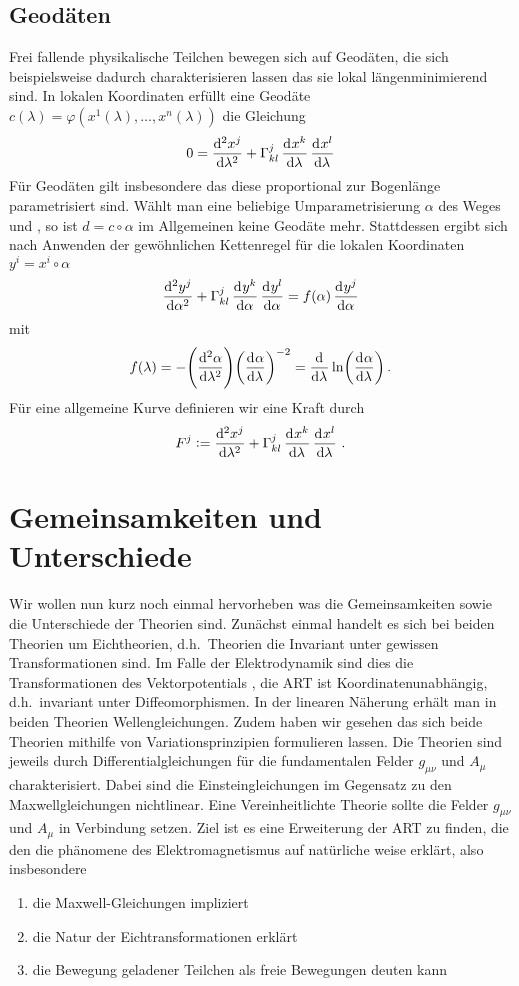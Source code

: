 \subsection{Geodäten}
Frei fallende physikalische Teilchen bewegen sich auf Geodäten, die sich 
beispielsweise dadurch charakterisieren lassen das sie lokal längenminimierend
sind. In lokalen Koordinaten erfüllt eine Geodäte 
$c(\lambda)=\varphi(x^1(\lambda),\dots, x^n(\lambda))$ die Gleichung
\begin{equation}
0=\dod[2]{x^j}{\lambda}+\Gamma^{j}_{kl}\dod{x^k}{\lambda}\dod{x^l}{\lambda}
\end{equation}
Für Geodäten gilt insbesondere das diese proportional zur Bogenlänge
parametrisiert sind. Wählt man eine beliebige Umparametrisierung  $\alpha$ des Weges 
und , so ist $d=c\circ \alpha$ im Allgemeinen keine
Geodäte mehr. Stattdessen ergibt sich nach Anwenden der gewöhnlichen Kettenregel
für die lokalen Koordinaten $y^i=x^i\circ\alpha$
\begin{equation}
\dod[2]{y^j}{\alpha}+\Gamma^{j}_{kl}\dod{y^k}{\alpha}\dod{y^l}{\alpha}
=f(\alpha)\dod{y^j}{\alpha}
\end{equation}
mit 
\begin{equation}
f(\lambda)
 =-\left(\dod[2]{\alpha}{\lambda}\right)\left(\dod{\alpha}{\lambda}\right)^{-2}
 =\dod{}{\lambda}\ln\left(\dod{\alpha}{\lambda}\right)\,.
\end{equation}
Für eine allgemeine Kurve definieren wir eine Kraft durch
\begin{equation}
F^j:=\dod[2]{x^j}{\lambda}+\Gamma^{j}_{kl}\dod{x^k}{\lambda}\dod{x^l}{\lambda}\,.
\end{equation}
\section{Gemeinsamkeiten und Unterschiede}
Wir wollen nun kurz noch einmal hervorheben was die Gemeinsamkeiten
sowie die Unterschiede der Theorien sind.
Zunächst einmal handelt es sich bei beiden Theorien um Eichtheorien, d.h.\
Theorien die Invariant unter gewissen Transformationen sind.
Im Falle der Elektrodynamik sind dies die Transformationen des 
Vektorpotentials 
, die ART ist Koordinatenunabhängig, d.h.\ invariant unter Diffeomorphismen.
In der linearen Näherung  
erhält man in beiden Theorien Wellengleichungen. Zudem haben wir gesehen das 
sich beide Theorien mithilfe von Variationsprinzipien formulieren lassen. 
Die Theorien sind jeweils durch Differentialgleichungen für die fundamentalen
Felder $g_{\mu\nu}$ und $A_\mu$ charakterisiert. 
Dabei sind die Einsteingleichungen im Gegensatz zu den Maxwellgleichungen
nichtlinear.
Eine Vereinheitlichte Theorie sollte die Felder $g_{\mu\nu}$ und $A_\mu$ in
Verbindung setzen.
Ziel ist es eine Erweiterung der ART zu finden, die den die phänomene des
Elektromagnetismus auf natürliche weise erklärt, also insbesondere
\begin{enumerate}
  \item die Maxwell-Gleichungen impliziert
  \item die Natur der Eichtransformationen erklärt
  \item die Bewegung geladener Teilchen als freie Bewegungen deuten kann
\end{enumerate}